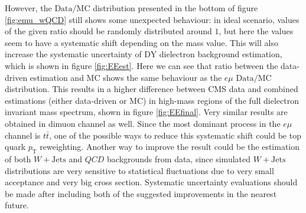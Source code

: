 \documentclass[a0,portrait]{a0poster}
\begin{document}
\begin{multicols}{2}
\begin{centering}
\begin{minipage}[t]{0.48\linewidth}
		\vspace{-0.7cm}
	\end{minipage}
\vspace{0.8cm}
\end{centering}

\noindent However, the $\mathrm{Data/MC}$ distribution presented in the bottom of figure \ref{fig:emu_wQCD} still shows some unexpected
behaviour: in ideal scenario, values of the given ratio should be randomly distributed around $1$, but here the values seem to have
a systematic shift depending on the mass value.
This will also increase the systematic uncertainty of DY dielectron background estimation, which is shown in figure \ref{fig:EEest}.
Here we can see that ratio between the data-driven estimation and MC shows the same behaviour as the $e\mu$ $\mathrm{Data/MC}$
distribution.
This results in a higher difference between CMS data and combined estimations (either data-driven or MC) in high-mass regions
of the full dielectron invariant mass spectrum, shown in figure \ref{fig:EEfinal}.
Very similar results are obtained in dimuon channel as well.
Since the most dominant process in the $e\mu$ channel is $t\bar{t}$, one of the possible ways to reduce this systematic shift
could be top quark $p_{\mathrm{T}}$ reweighting.
Another way to improve the result could be the estimation of both $W+\mathrm{Jets}$ and $QCD$ backgrounds from data, since simulated
$W+\mathrm{Jets}$ distributions are very sensitive to statistical fluctuations due to very small acceptance and very big cross section.
Systematic uncertainty evaluations should be made after including both of the suggested improvements in the nearest future.


\end{multicols}
\end{document}
